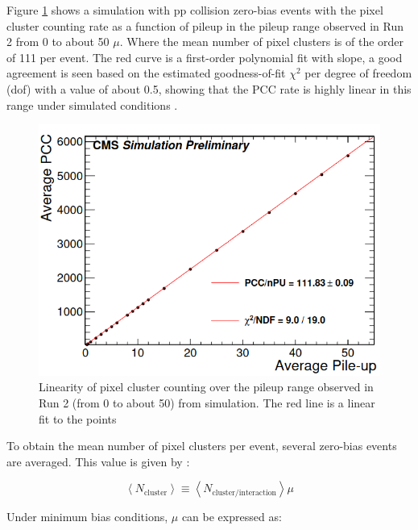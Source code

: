 Figure \ref{pileup} shows a simulation with pp collision zero-bias events with the pixel cluster counting rate as a function of pileup in the pileup range observed in Run 2 from 0 to about 50 $\mu$. Where the mean number of pixel clusters is of the order of  111 per event. The red curve is a first-order polynomial fit with slope, a good agreement is seen based on the estimated goodness-of-fit $\chi^{2}$ per degree of freedom (dof) with a value of about 0.5, showing that the PCC rate is highly linear in this range under simulated conditions \cite{ Phase2_Upgrade,lumi_precise_2015_2016}.

\begin{center}
  \begin{figure}[h!]
    \centering
    \includegraphics[scale=.35]{Chapter3/pileup_lineality.png} 
    \caption[Linearity with pile-up]{ Linearity of pixel cluster counting over the pileup range observed in Run 2 (from 0 to about 50) from simulation. The red line is a linear fit to the points \cite{Phase2_Upgrade} }
    \label{pileup}
  \end{figure}
\end{center}

To obtain the mean number of pixel clusters per event, several zero-bias events are averaged. This value is given by :

\begin{equation}
\left < N_{\text{cluster}} \right > \equiv \left < N_{\text{cluster}/\text{interaction}} \right > \mu
\end{equation}

Under minimum bias conditions, $\mu$ can be expressed as: 

